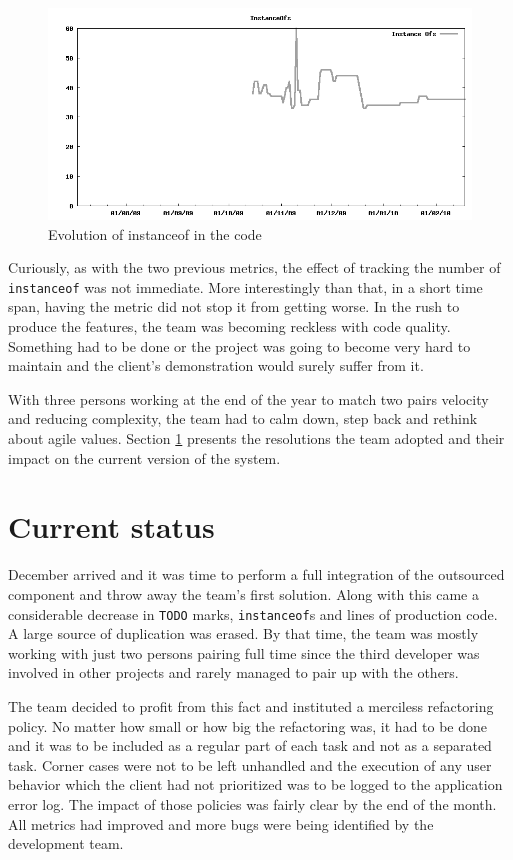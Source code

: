 \documentclass[lnbip]{svmultln}
\begin{document}
\begin{figure}[hbt]
  \centerline{
    \includegraphics[width=120mm]{InstanceOfs}
  }
  \caption{Evolution of instanceof in the code }
  \label{fig:InstanceOfs}
\end{figure}

Curiously, as with the two previous metrics, the effect of tracking
the number of \texttt{instanceof} was not immediate. More
interestingly than that, in a short time span, having the metric did
not stop it from getting worse. In the rush to produce the features,
the team was becoming reckless with code quality.  Something had to be
done or the project was going to become very hard to maintain and the
client's demonstration would surely suffer from it.

With three persons working at the end of the year to match two pairs
velocity and reducing complexity, the team had to calm down, step back
and rethink about agile values. Section \ref{sec:nowadays} presents
the resolutions the team adopted and their impact on the current
version of the system.

\section{Current status}
\label{sec:nowadays}

December arrived and it was time to perform a full integration of the
outsourced component and throw away the team's first solution. Along
with this came a considerable decrease in \texttt{TODO} marks,
\texttt{instanceof}s and lines of production code. A large source of
duplication was erased. By that time, the team was mostly working with
just two persons pairing full time since the third developer was
involved in other projects and rarely managed to pair up with the
others.

The team decided to profit from this fact and instituted a merciless
refactoring policy. No matter how small or how big the refactoring
was, it had to be done and it was to be included as a regular part of
each task and not as a separated task. Corner cases were not to be
left unhandled and the execution of any user behavior which the client
had not prioritized was to be logged to the application error log. The
impact of those policies was fairly clear by the end of the month. All
metrics had improved and more bugs were being identified by the
development team.
\end{document}
